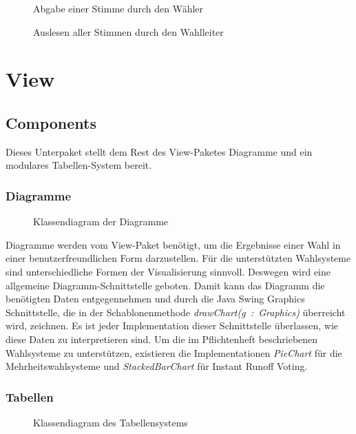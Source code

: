 \documentclass[parskip=full]{scrartcl}
\newcommand{\textitx}[1]{\mbox{\textit{#1}}}
\begin{document}
	\newpage
	\begin{figure}
		\centering
		\hspace{-100pt}
		\centerline{}
		\caption{Abgabe einer Stimme durch den Wähler}
		\label{fig:sdk_vote}
	\end{figure}
	\newpage
	\begin{figure}
		\centering
		\hspace{-100pt}
		\centerline{}
		\caption{Auslesen aller Stimmen durch den Wahlleiter}
		\label{fig:sdk_getallvotes}
	\end{figure}
	\newpage

	\section{View}
	\pagestyle{plain}	
		\subsection{Components}
		Dieses Unterpaket stellt dem Rest des View-Paketes Diagramme und ein modulares Tabellen-System bereit.
		
		\subsubsection{Diagramme}
		\begin{figure}[!h]
			\centering
			
			\caption{Klassendiagram der Diagramme}
		\end{figure}
		
		Diagramme werden vom View-Paket benötigt, um die Ergebnisse einer Wahl in einer benutzerfreundlichen Form darzustellen. Für die unterstützten Wahlsysteme sind unterschiedliche Formen der Visualisierung sinnvoll. Deswegen wird eine allgemeine Diagramm-Schnittstelle geboten. Damit kann das Diagramm die benötigten Daten entgegennehmen und durch die Java Swing Graphics Schnittstelle, die in der Schablonenmethode \textitx{drawChart(g : Graphics)} überreicht wird, zeichnen. Es ist jeder Implementation dieser Schnittstelle überlassen, wie diese Daten zu interpretieren sind. Um die im Pflichtenheft beschriebenen Wahlsysteme zu unterstützen, existieren die Implementationen \textitx{PieChart} für die Mehrheitswahlsysteme und \textitx{StackedBarChart} für Instant Runoff Voting.
		
		\subsubsection{Tabellen}
		\begin{figure}[!h]
		\centering
		
		\caption{Klassendiagram des Tabellensystems}
		\end{figure}
		
\end{document}
